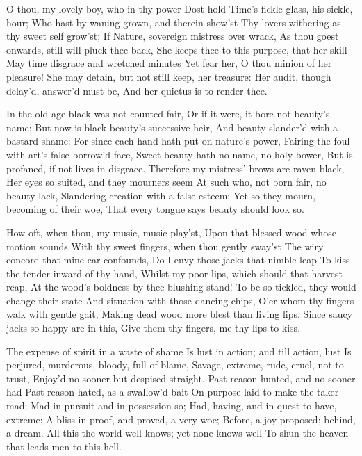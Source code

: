\documentclass[twocolumn]{book}
\begin{document}
{
\Forma{}%
O thou, my lovely boy, who in thy power
Dost hold Time's fickle glass, his sickle, hour;
Who hast by waning grown, and therein show'st
Thy lovers withering as thy sweet self grow'st;
If Nature, sovereign mistress over wrack,
As thou goest onwards, still will pluck thee back,
She keeps thee to this purpose, that her skill
May time disgrace and wretched minutes 
Yet fear her, O thou minion of her pleasure!
She may detain, but not still keep, her treasure:
  Her audit, though delay'd, answer'd must be,
  And her quietus is to render thee.
}

In the old age black was not counted fair,
Or if it were, it bore not beauty's name;
But now is black beauty's successive heir,
And beauty slander'd with a bastard shame:
For since each hand hath put on nature's power,
Fairing the foul with art's false borrow'd face,
Sweet beauty hath no name, no holy bower,
But is profaned, if not lives in disgrace.
Therefore my mistress' brows are raven black,
\numerus*{}Her eyes so suited, and they mourners seem
At such who, not born fair, no beauty lack,
Slandering creation with a false esteem:
  Yet so they mourn, becoming of their woe,
  That every tongue says beauty should look so.


How oft, when thou, my music, music play'st,
Upon that blessed wood whose motion sounds
With thy sweet fingers, when thou gently sway'st
The wiry concord that mine ear confounds,
Do I envy those jacks that nimble leap
To kiss the tender inward of thy hand,
Whilst my poor lips, which should that harvest reap,
At the wood's boldness by thee blushing stand!
To be so tickled, they would change their state
And situation with those dancing chips,
O'er whom thy fingers walk with gentle gait,
Making dead wood more blest than living lips.
  Since saucy jacks so happy are in this,
  Give them thy fingers, me thy lips to kiss.


The expense of spirit in a waste of shame
Is lust in action; and till action, lust
Is perjured, murderous, bloody, full of blame,
Savage, extreme, rude, cruel, not to trust,
Enjoy'd no sooner but despised straight,
Past reason hunted, and no sooner had
Past reason hated, as a swallow'd bait
On purpose laid to make the taker mad;
Mad in pursuit and in possession so;
\numerus*{}Had, having, and in quest to have, extreme;
A bliss in proof, and proved, a very woe;
Before, a joy proposed; behind, a dream.
  All this the world well knows; yet none knows well
  To shun the heaven that leads men to this hell.
\end{document}
